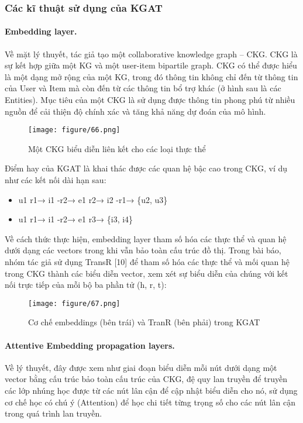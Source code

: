 \subsubsection{Các kĩ thuật sử dụng của KGAT}
\paragraph{Embedding layer.}
Về mặt lý thuyết, tác giả tạo một collaborative knowledge graph – CKG. CKG là sự kết hợp giữa một KG và một user-item bipartile graph. CKG có thể được hiểu là một dạng mở rộng của một KG, trong đó thông tin không chỉ đến từ thông tin của User và Item mà còn đến từ các thông tin bổ trợ khác (ở hình sau là các Entities). Mục tiêu của một CKG là sử dụng được thông tin phong phú từ nhiều nguồn để cải thiện độ chính xác và tăng khả năng dự đoán của mô hình.

\begin{figure}[h]
    \centering
    \texttt{[image: figure/66.png]}
    \caption{Một CKG biểu diễn liên kết cho các loại thực thể}
    \label{fig:ckg_example}
\end{figure}

Điểm hay của KGAT là khai thác được các quan hệ bậc cao trong CKG, ví dụ như các kết nối dài hạn sau:
\begin{itemize}
    \item u1  r1→  i1  -r2→  e1  r2→  i2  -r1→  \{u2,  u3\}
    \item u1  r1→  i1  -r2→  e1  r3→ \{i3,  i4\}
\end{itemize}

Về cách thức thực hiện, embedding layer tham số hóa các thực thể và quan hệ dưới dạng các vectors trong khi vẫn bảo toàn cấu trúc đồ thị. Trong bài báo, nhóm tác giả sử dụng TransR [10] để tham số hóa các thực thể và mối quan hệ trong CKG thành các biểu diễn vector, xem xét sự biểu diễn của chúng với kết nối trực tiếp của mỗi bộ ba phần tử (h, r, t):

\begin{figure}[h]
    \centering
    \texttt{[image: figure/67.png]}
    \caption{Cơ chế embeddings (bên trái) và TranR (bên phải) trong KGAT}
    \label{fig:embedding_process}
\end{figure}

\paragraph{Attentive Embedding propagation layers.}
Về lý thuyết, đây được xem như giai đoạn biểu diễn mỗi nút dưới dạng một vector bằng cấu trúc bảo toàn cấu trúc của CKG, đệ quy lan truyền để truyền các lớp nhúng học được từ các nút lân cận để cập nhật biểu diễn cho nó, sử dụng cơ chế học có chú ý (Attention) để học chi tiết từng trọng số cho các nút lân cận trong quá trình lan truyền.

